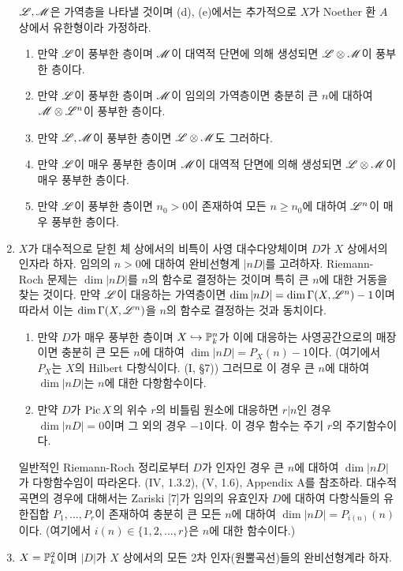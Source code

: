 \begin{enumerate}[label=\tb{7.\arabic*.},itemindent=0mm,itemsep=4mm]
		$\mathscr{L},\mathscr{M}$은 가역층을 나타낼 것이며 (d), (e)에서는 추가적으로 $X$가 Noether 환 $A$ 상에서 유한형이라 가정하라.
		\begin{enumerate}[label=(\alph*)]
			\item 만약 $\mathscr{L}$이 풍부한 층이며 $\mathscr{M}$이 대역적 단면에 의해 생성되면 $\mathscr{L}\otimes\mathscr{M}$이 풍부한 층이다.
			\item 만약 $\mathscr{L}$이 풍부한 층이며 $\mathscr{M}$이 임의의 가역층이면 충분히 큰 $n$에 대하여 $\mathscr{M}\otimes\mathscr{L}^n$이 풍부한 층이다.
			\item 만약 $\mathscr{L},\mathscr{M}$이 풍부한 층이면 $\mathscr{L}\otimes\mathscr{M}$도 그러하다.
			\item 만약 $\mathscr{L}$이 매우 풍부한 층이며 $\mathscr{M}$이 대역적 단면에 의해 생성되면 $\mathscr{L}\otimes\mathscr{M}$이 매우 풍부한 층이다.
			\item 만약 $\mathscr{L}$이 풍부한 층이면 $n_0>0$이 존재하여 모든 $n\ge n_0$에 대하여 $\mathscr{L}^n$이 매우 풍부한 층이다.
		\end{enumerate}
		\item {} $X$가 대수적으로 닫힌 체 상에서의 비특이 사영 대수다양체이며 $D$가 $X$ 상에서의 인자라 하자.
		임의의 $n>0$에 대하여 완비선형계 $|nD|$를 고려하자.
		Riemann-Roch 문제는 $\dim|nD|$를 $n$의 함수로 결정하는 것이며 특히 큰 $n$에 대한 거동을 찾는 것이다.
		만약 $\mathscr{L}$이 대응하는 가역층이면 $\dim|nD|=\dim\Gamma(X,\mathscr{L}^n)-1$이며
		따라서 이는 $\dim\Gamma(X,\mathscr{L}^n)$을 $n$의 함수로 결정하는 것과 동치이다.
		\begin{enumerate}[label=(\alph*)]
			\item 만약 $D$가 매우 풍부한 층이며 $X\hookrightarrow\mathbb{P}^n_k$가 이에 대응하는 사영공간으로의 매장이면 충분히 큰 모든 $n$에 대하여
			$\dim|nD|=P_X(n)-1$이다. (여기에서 $P_X$는 $X$의 Hilbert 다항식이다. (I, \S 7))
			그러므로 이 경우 큰 $n$에 대하여 $\dim|nD|$는 $n$에 대한 다항함수이다.
			\item 만약 $D$가 $\operatorname{Pic} X$의 위수 $r$의 비틀림 원소에 대응하면 $r|n$인 경우 $\dim|nD|=0$이며 그 외의 경우 $-1$이다.
			이 경우 함수는 주기 $r$의 주기함수이다.
		\end{enumerate}
		일반적인 Riemann-Roch 정리로부터 $D$가  인자인 경우 큰 $n$에 대하여 $\dim|nD|$가 다항함수임이 따라온다.
		(IV, 1.3.2), (V, 1.6), Appendix A를 참조하라. 대수적 곡면의 경우에 대해서는 Zariski [7]가 임의의 유효인자 $D$에 대하여
		다항식들의 유한집합 $P_1,\ldots,P_r$이 존재하여 충분히 큰 모든 $n$에 대하여 $\dim|nD|=P_{i(n)}(n)$이다.
		(여기에서 $i(n)\in\{1,2,\ldots,r\}$은 $n$에 대한 함수이다.)
		\item{} $X=\mathbb{P}_k^2$이며 $|D|$가 $X$ 상에서의 모든 2차 인자(원뿔곡선)들의 완비선형계라 하자.

\end{enumerate}
